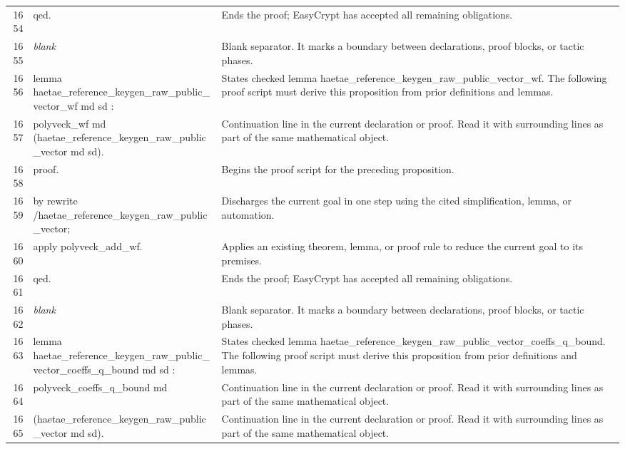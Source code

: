 \documentclass[10pt]{article}
\begin{document}
\begin{longtable}{r L{0.53\textwidth} L{0.37\textwidth}}
1654 & {\ttfamily\scriptsize qed.} & Ends the proof; EasyCrypt has accepted all remaining obligations. \\
1655 & {\ttfamily\scriptsize \emph{blank}} & Blank separator.  It marks a boundary between declarations, proof blocks, or tactic phases. \\
1656 & {\ttfamily\scriptsize lemma haetae\_reference\_keygen\_raw\_public\_vector\_wf md sd :} & States checked lemma haetae\_reference\_keygen\_raw\_public\_vector\_wf.  The following proof script must derive this proposition from prior definitions and lemmas. \\
1657 & {\ttfamily\scriptsize   polyveck\_wf md (haetae\_reference\_keygen\_raw\_public\_vector md sd).} & Continuation line in the current declaration or proof.  Read it with surrounding lines as part of the same mathematical object. \\
1658 & {\ttfamily\scriptsize proof.} & Begins the proof script for the preceding proposition. \\
1659 & {\ttfamily\scriptsize by rewrite /haetae\_reference\_keygen\_raw\_public\_vector;} & Discharges the current goal in one step using the cited simplification, lemma, or automation. \\
1660 & {\ttfamily\scriptsize    apply polyveck\_add\_wf.} & Applies an existing theorem, lemma, or proof rule to reduce the current goal to its premises. \\
1661 & {\ttfamily\scriptsize qed.} & Ends the proof; EasyCrypt has accepted all remaining obligations. \\
1662 & {\ttfamily\scriptsize \emph{blank}} & Blank separator.  It marks a boundary between declarations, proof blocks, or tactic phases. \\
1663 & {\ttfamily\scriptsize lemma haetae\_reference\_keygen\_raw\_public\_vector\_coeffs\_q\_bound md sd :} & States checked lemma haetae\_reference\_keygen\_raw\_public\_vector\_coeffs\_q\_bound.  The following proof script must derive this proposition from prior definitions and lemmas. \\
1664 & {\ttfamily\scriptsize   polyveck\_coeffs\_q\_bound md} & Continuation line in the current declaration or proof.  Read it with surrounding lines as part of the same mathematical object. \\
1665 & {\ttfamily\scriptsize     (haetae\_reference\_keygen\_raw\_public\_vector md sd).} & Continuation line in the current declaration or proof.  Read it with surrounding lines as part of the same mathematical object. \\

\end{longtable}
\end{document}
